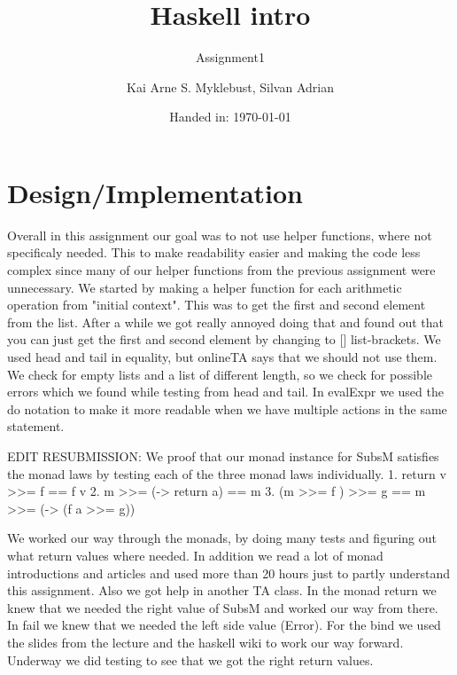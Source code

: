 \documentclass[12pt,a4paper]{article}
\begin{document}
\title{Haskell intro}
\subtitle{Assignment1}

\author{Kai Arne S. Myklebust, Silvan Adrian}
\date{Handed in: \today}
	
\maketitle
\tableofcontents

\section{Design/Implementation}

Overall in this assignment our goal was to not use helper functions, where not specificaly needed. This to make readability easier and making the code less complex since many of our helper functions from the previous assignment were unnecessary.
We started by making a helper function for each arithmetic operation from "initial context". This was to get the first and second element from the list. After a while we got really annoyed doing that and found out that you can just get the first and second element by changing to [] list-brackets.
We used head and tail in equality, but onlineTA says that we should not use them. We check for empty lists and a list of different length, so we check for possible errors which we found while testing from head and tail.
In evalExpr we used the do notation to make it more readable when we have multiple actions in the same statement.

EDIT RESUBMISSION:
We proof that our monad instance for SubsM satisfies the monad laws by testing each of the three monad laws individually.
1. return v >>= f == f v
2. m >>= (\a -> return a) == m
3. (m >>= f ) >>= g == m >>= (\a -> (f a >>= g))

We worked our way through the monads, by doing many tests and figuring out what return values where needed. In addition we read a lot of monad introductions and articles and used more than 20 hours just to partly understand this assignment. Also we got help in another TA class.
In the monad return we knew that we needed the right value of SubsM and worked our way from there. In fail we knew that we needed the left side value (Error).
For the bind we used the slides from the lecture and the haskell wiki to work our way forward. Underway we did testing to see that we got the right return values.
\end{document}
